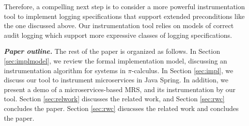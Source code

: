 Therefore, a compelling next step is to consider a more powerful instrumentation tool to implement logging specifications that support extended preconditions like the one discussed above. Our instrumentation tool relies on models of correct audit logging which support more expressive classes of logging specifications.




\textbf{\textit{Paper outline.}}
The rest of the paper is organized as follows. In Section \ref{sec:implmodel}, we review the formal implementation model, discussing an instrumentation algorithm for systems in $\pi$-calculus. In Section \ref{sec:impl}, we discuss our tool to instrument microservices in Java Spring. In addition, we present a demo of a microservices-based MRS, and its instrumentation by our tool. Section \ref{sec:relwork} discusses the related work, and Section \ref{sec:rwc} concludes the paper.
Section \ref{sec:rwc} disucsses the related work and concludes the paper.